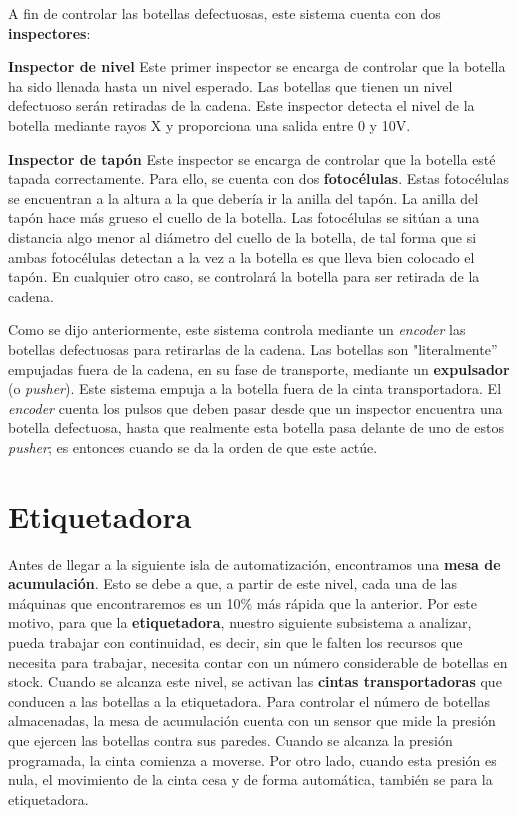 \documentclass[11pt,a4paper,spanish,twoside]{report}
\begin{document}
A fin de controlar las botellas defectuosas, este sistema cuenta con dos 
\textbf{inspectores}:
\begin{description}
\item \textbf{Inspector de nivel}
Este primer inspector se encarga de controlar que la botella ha sido llenada 
hasta un nivel esperado. Las botellas que tienen un nivel defectuoso serán 
retiradas de la cadena. Este inspector detecta el nivel de la botella mediante 
rayos X y proporciona una salida entre 0 y 10V.

\item \textbf{Inspector de tapón}
Este inspector se encarga de controlar que la botella esté tapada 
correctamente. Para ello, se cuenta con dos \textbf{fotocélulas}. Estas 
fotocélulas se encuentran a la altura a la que debería ir la anilla del tapón.
La anilla del tapón hace más grueso el cuello de la botella. Las fotocélulas 
se sitúan a una distancia algo menor al diámetro del cuello de la botella, de
tal forma que si ambas fotocélulas detectan a la vez a la botella es que lleva
bien colocado el tapón. En cualquier otro caso, se controlará la botella para
ser retirada de la cadena.
\end{description}

Como se dijo anteriormente, este sistema controla mediante un \emph{encoder} 
las botellas defectuosas para retirarlas de la cadena. Las botellas son 
"literalmente'' empujadas fuera de la cadena, en su fase de transporte, 
mediante un \textbf{expulsador} (o \emph{pusher}). Este sistema empuja a la
botella fuera de la cinta transportadora. El \emph{encoder} cuenta los pulsos
que deben pasar desde que un inspector encuentra una botella defectuosa, hasta
que realmente esta botella pasa delante de uno de estos \emph{pusher}; es 
entonces cuando se da la orden de que este actúe.
\section{Etiquetadora}
Antes de llegar a la siguiente isla de automatización, encontramos una 
\textbf{mesa de acumulación}. Esto se debe a que, a partir de este nivel, cada
una de las máquinas que encontraremos es un 10\% más rápida que la anterior.
Por este motivo, para que la \textbf{etiquetadora}, nuestro siguiente 
subsistema a analizar, pueda trabajar con continuidad, es decir, sin que le 
falten los recursos que necesita para trabajar, necesita contar con un número 
considerable de botellas en stock. Cuando se alcanza este nivel, se activan 
las \textbf{cintas transportadoras} que conducen a las botellas a la 
etiquetadora. Para controlar el número de botellas almacenadas, la mesa de 
acumulación cuenta con un sensor que mide la presión que ejercen las botellas 
contra sus paredes. Cuando se alcanza la presión programada, la cinta comienza 
a moverse. Por otro lado, cuando esta presión es nula, el movimiento de la 
cinta cesa y de forma automática, también se para la etiquetadora.
\end{document}
